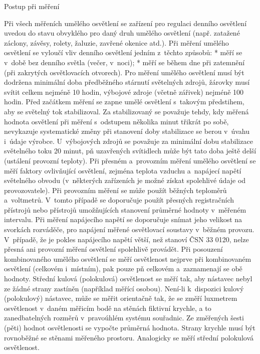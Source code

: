 \sec Postup při měření

Při všech měřeních umělého osvětlení se zařízení pro regulaci denního osvětlení uvedou do stavu
obvyklého pro daný druh umělého osvětlení (např. zatažené záclony, závěsy, rolety, žaluzie, zavřené okenice atd.).
Při měření umělého osvětlení se vyloučí vliv denního osvětlení jedním z~těchto způsobů:
\medskip
\begitems
    * měří se v~době bez denního světla (večer, v~noci);
    * měří se během dne při zatemnění (při zakrytých osvětlovacích otvorech).
\enditems
\medskip
Pro měření umělého osvětlení musí být dodržena minimální doba předběžného stárnutí světelných zdrojů,
žárovky musí svítit celkem nejméně 10 hodin, výbojové zdroje (včetně zářivek) nejméně 100 hodin.
\medskip
Před začátkem měření se zapne umělé osvětlení s~takovým předstihem, aby se světelný tok stabilizoval.
Za stabilizovaný se považuje tehdy, kdy měřená hodnota osvětlení při měření s~odstupem několika minut
třikrát po sobě, nevykazuje systematické změny při stanovení doby stabilizace se berou v~úvahu i~údaje výrobce.
U~výbojových zdrojů se považuje za minimální dobu stabilizace světelného toku 20 minut, pň uzavřených
svítidlech může být tato doba ještě delší (ustálení provozní teploty).
\medskip
Při přesném a~provozním měření umělého osvětlení se měří faktory ovlivňující osvětlení, zejména teplota
vzduchu a~napájecí napětí světelného obvodu (v~některých zařízeních je možné získat spolehlivé údaje od
provozovatele). Při provozním měření se může použít běžných teploměrů a~voltmetrů. V~tomto případě se
doporučuje použít přesných registračních přístrojů nebo přístrojů umožňujících stanovení průměrné hodnoty
v~měřeném intervalu. Při měření napájecího napětí se doporučuje snímat jeho velikost na svorkách rozváděče,
pro napájení měřené osvětlovací soustavy v~běžném provozu. V~případě, že je pokles napájecího napětí větší,
než stanoví ČSN 33 0120, nelze přesná ani provozní měření osvětlení spolehlivě provádět.
\medskip
Při posouzení kombinovaného umělého osvětlení se měří osvětlenost nejprve při kombinovaném osvětlení
(celkovém i~místním), pak pouze pň celkovém a~zaznamenají se obě hodnoty.
Střední kulová (polokulová) osvětlenost se měří tak, aby nástavec nebyl ze žádné strany zastíněn
(například měřící osobou). Není-li k~dispozici kulový (polokulový) nástavec, může se měřit
orientačně tak, že se změří luxmetrem osvětlenost v~daném měřicím bodě na stěnách fiktivní krychle,
a to zanedbatelných rozměrů v~pravoúhlém systému souřadnic. Ze změřených šesti (pěti) hodnot osvětlenosti
se vypočte průměrná hodnota. Strany krychle musí být rovnoběžné se stěnami měřeného prostoru.
Analogicky se měří střední polokulová osvětlenost.

